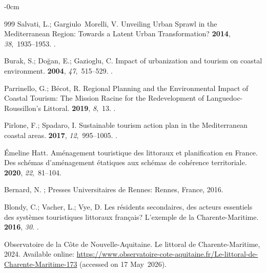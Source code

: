 \documentclass[coasts,article,accept,pdftex,moreauthors]{Definitions/mdpi}
\begin{document}
\begin{adjustwidth}{-\extralength}{0cm}
\begin{thebibliography}{999}
Salvati, L.; Gargiulo~Morelli, V.
\newblock Unveiling Urban Sprawl in the {Mediterranean} Region: Towards a
  Latent Urban Transformation?
 {\bf
  2014}, {\em 38},~1935--1953.
.

Burak, S.; Do{\u g}an, E.; Gazioglu, C.
\newblock Impact of urbanization and tourism on coastal environment.
 {\bf 2004}, {\em 47},~515--529.
.

Parrinello, G.; B{\'e}cot, R.
\newblock Regional Planning and the Environmental Impact of Coastal Tourism:
  The Mission Racine for the Redevelopment of {Languedoc-Roussillon}'s
  Littoral.
 {\bf 2019}, {\em 8},~13.
.

Pirlone, F.; Spadaro, I.
\newblock Sustainable tourism action plan in the {Mediterranean} coastal areas.
  {\bf 2017}, {\em 12},~995--1005.
.

Émeline Hatt.
\newblock Aménagement touristique des littoraux et planification en France.
  Des schémas d’aménagement étatiques aux schémas de cohérence
  territoriale.
 {\bf 2020}, {\em
  22},~81--104.

Bernard, N.
; Presses Universitaires de Rennes:
  Rennes, France,  2016.

Blondy, C.; Vacher, L.; Vye, D.
\newblock Les résidents secondaires, des acteurs essentiels des systèmes
  touristiques littoraux français? L’exemple de la Charente-Maritime.
 {\bf 2016}, {\em 30}.
.

{Observatoire de la Côte de Nouvelle-Aquitaine}.
\newblock Le littoral de Charente-Maritime, 2024. Available online:
  \url{https://www.observatoire-cote-aquitaine.fr/Le-littoral-de-Charente-Maritime-173}
  (accessed on 17 May~2026).


\end{thebibliography}
\end{adjustwidth}
\end{document}

